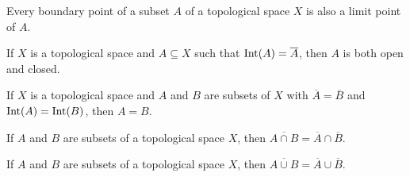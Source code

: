 	\item Every boundary point of a subset $A$ of a topological space $X$ is also a limit point of $A$. 

	\item If $X$ is a topological space and $A \subseteq X$ such that $\text{Int}(A)=\overline{A}$, then $A$ is both open and closed.

	\item If $X$ is a topological space and $A$ and $B$ are subsets of $X$ with $\overline{A}=\overline{B}$ and $\text{Int}(A) = \text{Int}(B)$, then $A = B$.
	
	\item If $A$ and $B$ are subsets of a topological space $X$, then $\overline{A \cap B} = \overline{A} \cap \overline{B}$. 
	
	\item If $A$ and $B$ are subsets of a topological space $X$, then $\overline{A \cup B} = \overline{A} \cup \overline{B}$. 
	
	\ea

